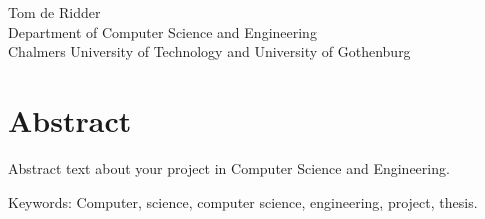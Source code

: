 \oneLineTitle\\
\oneLineSubtitle\\
Tom de Ridder\\
Department of Computer Science and Engineering\\
Chalmers University of Technology and University of Gothenburg

\thispagestyle{plain}			%
\section*{Abstract}
Abstract text about your project in  Computer Science and Engineering.

\vfill
Keywords: Computer, science, computer science, engineering, project, thesis.

\newpage				%
\thispagestyle{empty}
\mbox{}